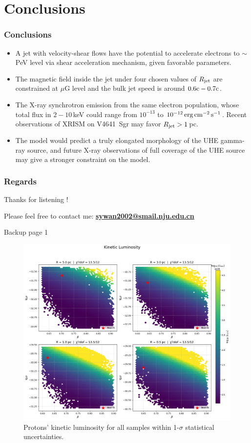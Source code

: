 \documentclass[10pt,aspectratio=169,mathserif]{beamer}
\begin{document}
\section{Conclusions}
\begin{frame}
  \frametitle{Conclusions}
  \begin{itemize}
      \item A jet with velocity-shear flows have the potential to accelerate electrons to $\sim$ PeV level via shear acceleration mechanism, given favorable parameters.

      \item The magnetic field inside the jet under four chosen values of $R_{\rm jet}$ are constrained at $\mu$G level and the bulk jet speed is around $0.6\rm c-0.7\rm c$.

      \item The X-ray synchrotron emission from the same electron population, whose total flux in $2-10$\,keV could range from $10^{-13}$ to $10^{-12}\rm \,erg\,cm^{-2}\,s^{-1}$. Recent observations of XRISM on V4641~Sgr may favor $R_{\rm jet} > 1$\,pc. 

      \item The model would predict a truly elongated morphology of the UHE gamma-ray source, and future X-ray observations of full coverage of the UHE source may give a stronger constraint on the model.
  \end{itemize}
\end{frame}

\begin{frame}
\frametitle{Regards}
\Huge{\centerline{Thanks for listening !}}
\centerline{\small Please feel free to contact me: \textbf{\small \url{sywan2002@smail.nju.edu.cn}}
}
\end{frame}





\begin{frame}{Backup page 1}
\begin{figure}[ht]
    \centering
        \includegraphics[width=0.5\linewidth]{proton_kin.png}
        \caption{Protons' kinetic luminosity for all samples within 1-$\sigma$ statistical uncertainties.}
        \label{fig:sub1}
\end{figure}
\end{frame}
\end{document}
